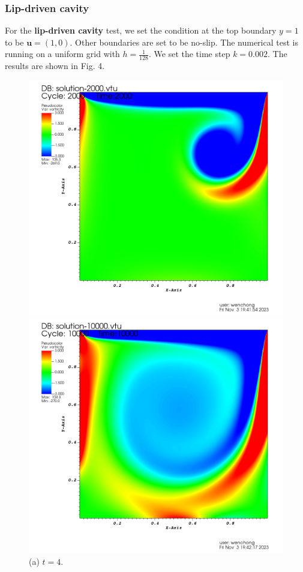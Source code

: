 \documentclass[lang=en,11pt,a4paper,bibend=bibtex]{elegantpaper}
\begin{document}
\subsubsection{Lip-driven cavity}

For the \textbf{lip-driven cavity} test, we set the condition at
the top boundary $y=1$ to be $\mathbf{u}=(1,0)$. Other boundaries
are set to be no-slip. The numerical test is running on a uniform grid 
with $h=\frac{1}{128}$. We set the time step $k=0.002$. The results
are shown in Fig. 4.

\begin{figure}[H]
    \centering
    \begin{minipage}[t]{0.45\linewidth}
        \centering
        \includegraphics[width=0.9\linewidth]{png/lip-4.png}
        \caption*{(a) $t=4$.}
        \includegraphics[width=0.9\linewidth]{png/lip-20.png}

\end{minipage}
\end{figure}
\end{document}
